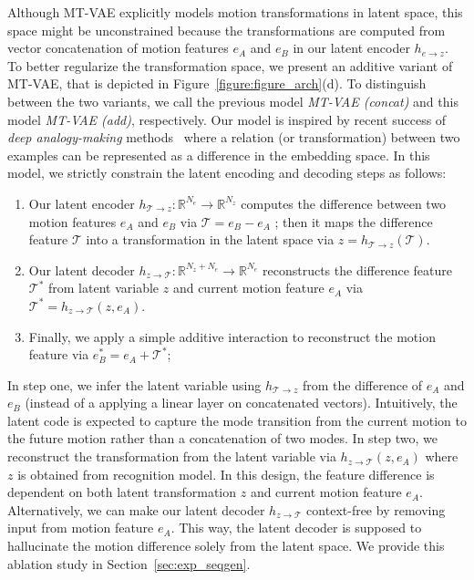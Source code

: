 \documentclass[runningheads]{llncs}
\begin{document}
Although MT-VAE explicitly models motion transformations in latent space, this space might be unconstrained because the transformations are computed from vector concatenation of motion features $e_A$ and $e_B$ in our latent encoder $h_{e\rightarrow z}$.
To better regularize the transformation space, we present an additive variant of MT-VAE, that is depicted in Figure~\ref{figure:figure_arch}(d).
To distinguish between the two variants, we call the previous model \emph{MT-VAE (concat)} and this model \emph{MT-VAE (add)}, respectively.
Our model is inspired by recent success of \emph{deep analogy-making} methods~\cite{reed2015deep,villegas2017decomposing} where a relation (or transformation) between two examples can be represented as a difference in the embedding space.
In this model, we strictly constrain the latent encoding and decoding steps as follows:
\begin{enumerate}
    \item Our latent encoder $h_{\mathcal{T}\rightarrow z}: \mathbb{R}^{N_e} \rightarrow \mathbb{R}^{N_z}$ computes the difference between two motion features $e_A$ and $e_B$ via $\mathcal{T} = e_B - e_A$ ; then it maps the difference feature $\mathcal{T}$ into a transformation in the latent space via $z = h_{\mathcal{T}\rightarrow z}(\mathcal{T})$.
    \item Our latent decoder $h_{z\rightarrow \mathcal{T}}: \mathbb{R}^{N_z + N_e} \rightarrow \mathbb{R}^{N_e}$ reconstructs the difference feature $\mathcal{T}^*$ from latent variable $z$ and current motion feature $e_A$ via $\mathcal{T}^* = h_{z\rightarrow \mathcal{T}}(z, e_A)$.
    \item Finally, we apply a simple additive interaction to reconstruct the motion feature via $e^*_B = e_A + \mathcal{T}^*$;\\
\end{enumerate}
\vspace*{-0.16in}

In step one, we infer the latent variable using $h_{\mathcal{T}\rightarrow z}$ from the difference of $e_A$ and $e_B$ (instead of a applying a linear layer on concatenated vectors).
Intuitively, the latent code is expected to capture the mode transition from the current motion to the future motion rather than a concatenation of two modes.
In step two, we reconstruct the transformation from the latent variable via $h_{z\rightarrow \mathcal{T}}(z, e_A)$ where $z$ is obtained from recognition model.
In this design, the feature difference is dependent on both latent transformation $z$ and current motion feature $e_A$.
Alternatively, we can make our latent decoder $h_{z\rightarrow \mathcal{T}}$ context-free by removing input from motion feature $e_A$.
This way, the latent decoder is supposed to hallucinate the motion difference solely from the latent space. We provide this ablation study in Section~\ref{sec:exp_seqgen}.
\end{document}
